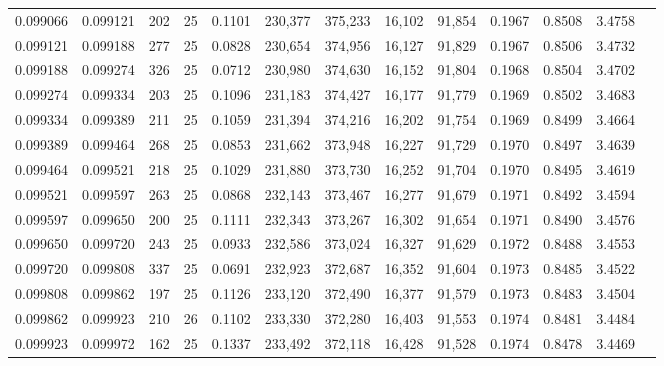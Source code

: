 \begin{tabular}{rrrrrrrrrrrrr}
0.099066 & 0.099121 &   202 &  25 &                                     0.1101 & 230,377 & 375,233 &  16,102 &  91,854 & 0.1967 & 0.8508 & 3.4758 \\
0.099121 & 0.099188 &   277 &  25 &                                     0.0828 & 230,654 & 374,956 &  16,127 &  91,829 & 0.1967 & 0.8506 & 3.4732 \\
0.099188 & 0.099274 &   326 &  25 &                                     0.0712 & 230,980 & 374,630 &  16,152 &  91,804 & 0.1968 & 0.8504 & 3.4702 \\
0.099274 & 0.099334 &   203 &  25 &                                     0.1096 & 231,183 & 374,427 &  16,177 &  91,779 & 0.1969 & 0.8502 & 3.4683 \\
0.099334 & 0.099389 &   211 &  25 &                                     0.1059 & 231,394 & 374,216 &  16,202 &  91,754 & 0.1969 & 0.8499 & 3.4664 \\
0.099389 & 0.099464 &   268 &  25 &                                     0.0853 & 231,662 & 373,948 &  16,227 &  91,729 & 0.1970 & 0.8497 & 3.4639 \\
0.099464 & 0.099521 &   218 &  25 &                                     0.1029 & 231,880 & 373,730 &  16,252 &  91,704 & 0.1970 & 0.8495 & 3.4619 \\
0.099521 & 0.099597 &   263 &  25 &                                     0.0868 & 232,143 & 373,467 &  16,277 &  91,679 & 0.1971 & 0.8492 & 3.4594 \\
0.099597 & 0.099650 &   200 &  25 &                                     0.1111 & 232,343 & 373,267 &  16,302 &  91,654 & 0.1971 & 0.8490 & 3.4576 \\
0.099650 & 0.099720 &   243 &  25 &                                     0.0933 & 232,586 & 373,024 &  16,327 &  91,629 & 0.1972 & 0.8488 & 3.4553 \\
0.099720 & 0.099808 &   337 &  25 &                                     0.0691 & 232,923 & 372,687 &  16,352 &  91,604 & 0.1973 & 0.8485 & 3.4522 \\
0.099808 & 0.099862 &   197 &  25 &                                     0.1126 & 233,120 & 372,490 &  16,377 &  91,579 & 0.1973 & 0.8483 & 3.4504 \\
0.099862 & 0.099923 &   210 &  26 &                                     0.1102 & 233,330 & 372,280 &  16,403 &  91,553 & 0.1974 & 0.8481 & 3.4484 \\
0.099923 & 0.099972 &   162 &  25 &                                     0.1337 & 233,492 & 372,118 &  16,428 &  91,528 & 0.1974 & 0.8478 & 3.4469 \\

\end{tabular}
